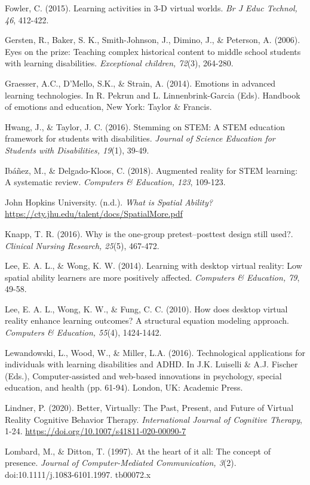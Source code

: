 \documentclass[11.5pt]{sig-alternate} %
\begin{document}
Fowler, C. (2015). Learning activities in 3‐D virtual worlds. \textit{Br J Educ Technol, 46}, 412-422.

Gersten, R., Baker, S. K., Smith-Johnson, J., Dimino, J., \& Peterson, A. (2006). Eyes on the prize: Teaching complex historical content to middle school students with learning disabilities. \textit{Exceptional children, 72}(3), 264-280.

Graesser, A.C., D’Mello, S.K., \& Strain, A. (2014). Emotions in advanced learning technologies. In R. Pekrun and L. Linnenbrink-Garcia (Eds). Handbook of emotions and education, New York: Taylor \& Francis.

Hwang, J., \& Taylor, J. C. (2016). Stemming on STEM: A STEM education framework for students with disabilities. \textit{Journal of Science Education for Students with Disabilities, 19}(1), 39-49.

Ibáñez, M., \& Delgado-Kloos, C. (2018). Augmented reality for STEM learning: A systematic review. \textit{Computers \& Education, 123}, 109-123.

John Hopkins University. (n.d.). \textit{What is Spatial Ability?} \url{https://cty.jhu.edu/talent/docs/SpatialMore.pdf}

Knapp, T. R. (2016). Why is the one-group pretest–posttest design still used?. \textit{Clinical Nursing Research, 25}(5), 467-472. 

Lee, E. A. L., \& Wong, K. W. (2014). Learning with desktop virtual reality: Low spatial ability learners are more positively affected. \textit{Computers \& Education, 79}, 49-58.

Lee, E. A. L., Wong, K. W., \& Fung, C. C. (2010). How does desktop virtual reality enhance learning outcomes? A structural equation modeling approach. \textit{Computers \& Education, 55}(4), 1424-1442.

Lewandowski, L., Wood, W., \& Miller, L.A. (2016). Technological applications for individuals with learning disabilities and ADHD. In J.K. Luiselli \& A.J. Fischer (Eds.), Computer-assisted and web-based innovations in psychology, special education, and health (pp. 61-94). London, UK: Academic Press.

Lindner, P. (2020). Better, Virtually: The Past, Present, and Future of Virtual Reality Cognitive Behavior Therapy. \textit{International Journal of Cognitive Therapy}, 1-24. \url{https://doi.org/10.1007/s41811-020-00090-7}

Lombard, M., \& Ditton, T. (1997). At the heart of it all: The concept of presence. \textit{Journal of Computer-Mediated Communication, 3}(2). doi:10.1111/j.1083-6101.1997. tb00072.x
\end{document}
